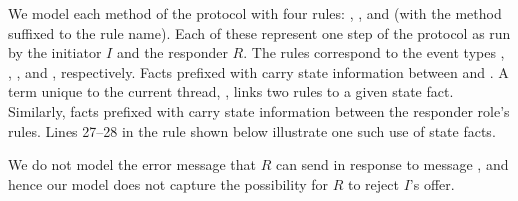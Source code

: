 We model each method of the protocol with four rules: , , 
and  (with the method suffixed to the rule name).
%
Each of these represent one step of the protocol as run by the initiator $I$
and the responder $R$.
%
The rules correspond to the event types \mIStart, \mRStart, \mIComplete,  and
\mRComplete, respectively.%
%
Facts prefixed with  carry state information between  and .
%
A term unique to the current thread, , links two rules to a given state fact.
%
Similarly, facts prefixed with  carry state information between the
responder role's rules.
%
Lines 27--28 in the  rule shown below illustrate one such use of state
facts.
%

%
We do not model the error message that $R$ can send in response to message
\mMsgone, and hence our model does not
capture the possibility for $R$ to reject $I$'s offer.
%


